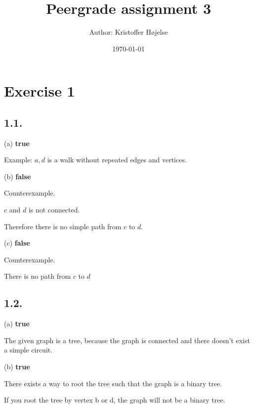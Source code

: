 \documentclass[a4paper,11pt]{article}
\title{Peergrade assignment 3}
\author{Author: Kristoffer Højelse}
\date{\today}
\begin{document}
 

\maketitle

\section*{Exercise 1}

\subsection*{1.1.}

\noindent (a) \textbf{true}

Example: $a,d$ is a walk without repeated edges and vertices.

\noindent (b) \textbf{false}

Counterexample.

$c$ and $d$ is not connected.

Therefore there is no simple path from $c$ to $d$.

\noindent (c) \textbf{false}

Counterexample.

There is no path from $c$ to $d$
\subsection*{1.2.}

\noindent (a) \textbf{true}

The given graph is a tree, because the graph is connected and there doesn't exist a simple circuit.

\noindent (b) \textbf{true}

There exists a way to root the tree such that the graph is a binary tree.

\begin{center}
\end{center}

If you root the tree by vertex b or d, the graph will not be a binary tree.
\end{document}
